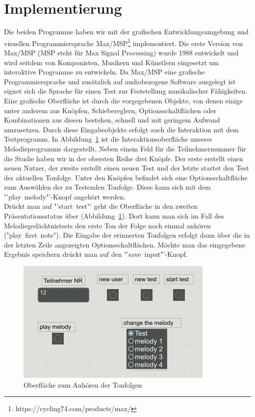 \documentclass{acm_proc_article-sp}
\begin{document}
\section{Implementierung}
Die beiden Programme haben wir mit der grafischen Entwicklungsumgebung und visuellen Programmiersprache Max\slash MSP\footnote{https://cycling74.com/products/max/} implementiert. Die erste Version von Max\slash MSP (MSP steht für Max Signal Processing) \cite{wiki:max} wurde 1988 entwickelt und wird seitdem von Komponisten, Musikern und Künstlern eingesetzt um interaktive Programme zu entwickeln. Da Max\slash MSP eine grafische Programmiersprache und zusätzlich auf audiobezogene Software ausgelegt ist eignet sich die Sprache für einen Test zur Feststellung musikalischer Fähigkeiten.\\
Eine grafische Oberfläche ist durch die vorgegebenen Objekte, von denen einige unter anderem aus Knöpfen, Schiebereglern, Optionsschaltflächen oder Kombinationen aus diesen bestehen, schnell und mit geringem Aufwand umzusetzen. Durch diese Eingabeobjekte erfolgt auch die Interaktion mit dem Testprogramm. In Abbildung~\ref{maxfirststep} ist die Interaktionsoberfläche unseres Melodieprogramms dargestellt. Neben einem Feld für die Teilnehmernummer für die Studie haben wir in der obersten Reihe drei Knöpfe. Der erste erstellt einen neuen Nutzer, der zweite erstellt einen neuen Test und der letzte startet den Test der aktuellen Tonfolge.
Unter den Knöpfen befindet sich eine Optionsschaltfläche zum Auswählen der zu Testenden Tonfolge. Diese kann sich mit dem "'play~melody"'-Knopf angehört werden.\\
Drückt man auf "'start~test"' geht die Oberfläche in den zweiten Präsentationsstatus über (Abbildung~\ref{maxfirststep}). Dort kann man sich im Fall des Melodiegedächtnistests den erste Ton der Folge noch einmal anhören ("play~first~note"). Die Eingabe der erinnerten Tonfolgen erfolgt dann über die in der letzten Zeile angezeigten Optionsschaltflächen. Möchte man das eingegebene Ergebnis speichern drückt man auf den "'save~input"'-Knopf. 

\begin{figure}[H]
\includegraphics[width=1.0\linewidth]{Abbildungen/firststep.png}
\caption{Oberfläche zum Anhören der Tonfolgen}
\label{maxfirststep}
\end{figure}
\end{document}
